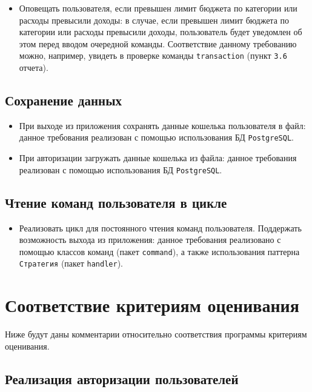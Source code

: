 \documentclass[a4paper, 14pt]{article}
\begin{document}
\begin{itemize}
	\item Оповещать пользователя, если превышен лимит бюджета по категории или расходы превысили доходы: в случае, если превышен лимит бюджета по категории или расходы превысили доходы, пользователь будет уведомлен об этом перед вводом очередной команды. Соответствие данному требованию можно, например, увидеть в проверке команды \texttt{transaction} (пункт \texttt{3.6} отчета).
\end{itemize}

\subsection{Сохранение данных}

\begin{itemize}
	\item При выходе из приложения сохранять данные кошелька пользователя в файл:  данное требования реализован с помощью использования БД \texttt{PostgreSQL}.
	\item При авторизации загружать данные кошелька из файла: данное требования реализован с помощью использования БД \texttt{PostgreSQL}.
\end{itemize}

\subsection{Чтение команд пользователя в цикле}

\begin{itemize}
	\item Реализовать цикл для постоянного чтения команд пользователя. Поддержать возможность выхода из приложения: данное требования реализовано с помощью классов команд (пакет \texttt{command}), а также использования паттерна \texttt{Стратегия} (пакет \texttt{handler}).
\end{itemize}

\newpage
\section{Соответствие критериям оценивания}

Ниже будут даны комментарии относительно соответствия программы критериям оценивания.

\subsection{Реализация авторизации пользователей}
\end{document}
